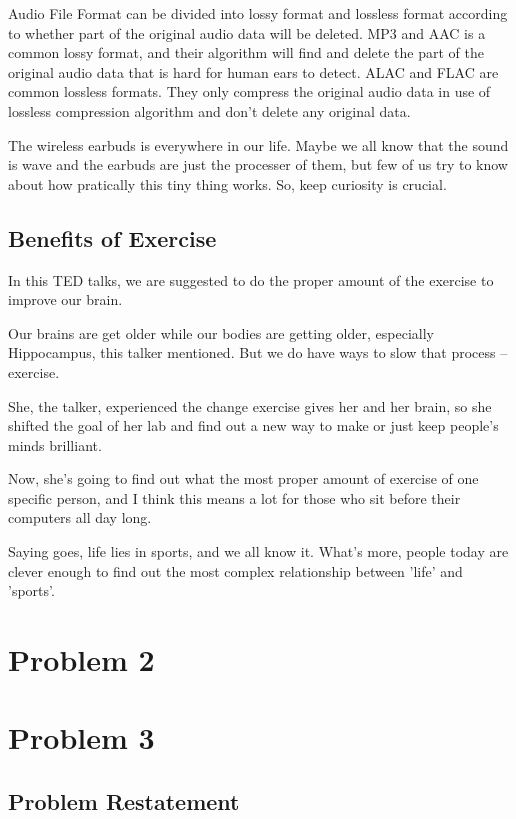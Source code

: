 \documentclass{article}
\begin{document}
Audio File Format can be divided into lossy format and lossless format according to whether part of the original audio data will be deleted. MP3 and AAC is a common lossy format, and their algorithm will find and delete the part of the original audio data that is hard for human ears to detect. ALAC and FLAC are common lossless formats. They only compress the original audio data in use of lossless compression algorithm and don't delete any original data.

The wireless earbuds is everywhere in our life. Maybe we all know that the sound is wave and the earbuds are just the processer of them, but few of us try to know about how pratically this tiny thing works. So, keep curiosity is crucial.

\subsection{Benefits of Exercise}

In this TED talks, we are suggested to do the proper amount of the exercise to improve our brain.

Our brains are get older while our bodies are getting older, especially Hippocampus, this talker mentioned. But we do have ways to slow that process -- exercise.

She, the talker, experienced the change exercise gives her and her brain, so she shifted the goal of her lab and find out a new way to make or just keep people's minds brilliant. 

Now, she's going to find out what the most proper amount of exercise of one specific person, and I think this means a lot for those who sit before their computers all day long.

Saying goes, life lies in sports, and we all know it. What's more, people today are clever enough to find out the most complex relationship between 'life' and 'sports'.

\section{Problem 2}

\section{Problem 3}

\subsection{Problem Restatement}
\end{document}
